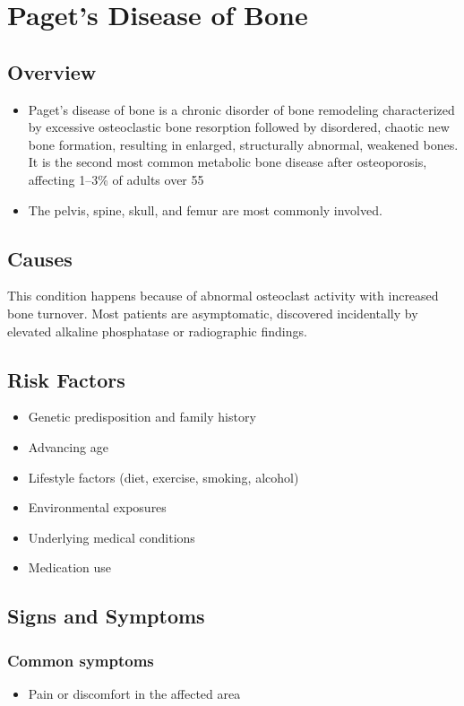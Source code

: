 \chapter{Paget's Disease of Bone}
\label{sec:Paget's Disease of Bone}

\section{Overview}


\begin{itemize}[noitemsep]
  \item Paget's disease of bone is a chronic disorder of bone remodeling characterized by excessive osteoclastic bone resorption followed by disordered, chaotic new bone formation, resulting in enlarged, structurally abnormal, weakened bones. It is the second most common metabolic bone disease after osteoporosis, affecting 1--3\% of adults over 55
  \item The pelvis, spine, skull, and femur are most commonly involved.
\end{itemize}
\section{Causes}
This condition happens because of abnormal osteoclast activity with increased bone turnover. Most patients are asymptomatic, discovered incidentally by elevated alkaline phosphatase or radiographic findings.     
\section{Risk Factors}

\begin{itemize}[noitemsep]
  \item Genetic predisposition and family history
  \item Advancing age
  \item Lifestyle factors (diet, exercise, smoking, alcohol)
  \item Environmental exposures
  \item Underlying medical conditions
  \item Medication use
\end{itemize}
\section{Signs and Symptoms}

\subsection{Common symptoms}
\begin{itemize}[noitemsep]
  \item Pain or discomfort in the affected area
  \end{itemize}

